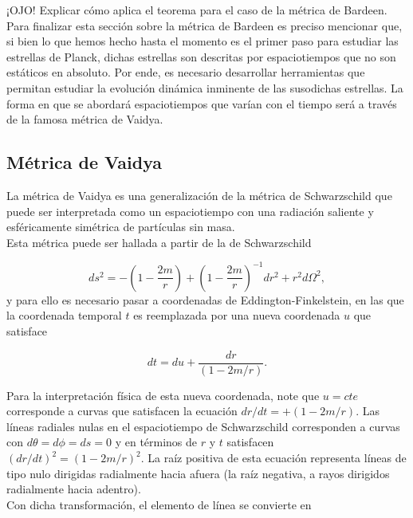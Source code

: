 \documentclass{article}
\numberwithin{equation}{section}
\theoremstyle{definition}
\begin{document}
¡OJO! Explicar cómo aplica el teorema para el caso de la métrica de Bardeen.\\

Para finalizar esta sección sobre la métrica de Bardeen es preciso mencionar que, si bien lo que hemos hecho hasta el momento es el primer paso para estudiar las estrellas de Planck, dichas estrellas son descritas por espaciotiempos que no son estáticos en absoluto. Por ende, es necesario desarrollar herramientas que permitan estudiar la evolución dinámica inminente de las susodichas estrellas. La forma en que se abordará espaciotiempos que varían con el tiempo será a través de la famosa métrica de Vaidya.

\subsection{Métrica de Vaidya}

La métrica de Vaidya \cite{padmanabhan} es una generalización de la métrica de Schwarzschild que puede ser interpretada como un espaciotiempo con una radiación saliente y esféricamente simétrica de partículas sin masa.\\

Esta métrica puede ser hallada a partir de la de Schwarzschild 

\begin{equation}
ds^2 = -\left( 1 - \frac{2m}{r} \right) + \left( 1 - \frac{2m}{r} \right)^{-1}dr^2 + r^2d\Omega^2,
\end{equation}
y para ello es necesario pasar a coordenadas de Eddington-Finkelstein, en las que la coordenada temporal $t$ es reemplazada por una nueva coordenada $u$ que satisface

\begin{equation}
dt = du + \frac{dr}{(1 - 2m/r)}.
\end{equation}

Para la interpretación física de esta nueva coordenada, note que $u = cte$ corresponde a curvas que satisfacen la ecuación $dr/dt = +\left( 1 -2m/r \right)$. Las líneas radiales nulas en el espaciotiempo de Schwarzschild corresponden a curvas con $d\theta = d\phi = ds = 0$ y en términos de $r$ y $t$ satisfacen $(dr/dt)^2 = \left( 1 -2m/r \right)^2$. La raíz positiva de esta ecuación representa líneas de tipo nulo dirigidas radialmente hacia afuera (la raíz negativa, a rayos dirigidos radialmente hacia adentro).\\

Con dicha transformación, el elemento de línea se convierte en 
\end{document}
